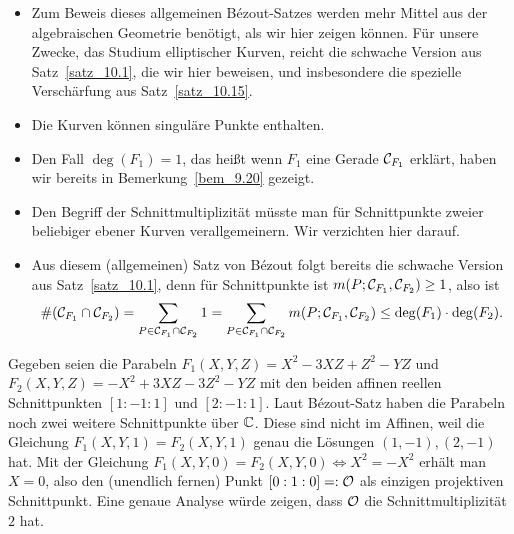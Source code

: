 \begin{bem}
	\begin{itemize}
		\item Zum Beweis dieses allgemeinen Bézout-Satzes werden mehr Mittel aus der algebraischen Geometrie benötigt, als wir hier zeigen können. 
		Für unsere Zwecke, das Studium elliptischer Kurven, reicht die schwache Version aus Satz~\ref{satz_10.1}, die wir hier beweisen, und insbesondere die spezielle Verschärfung aus Satz~\ref{satz_10.15}.
		\item Die Kurven können singuläre Punkte enthalten.
		\item Den Fall $\deg(F_1) = 1$, das heißt wenn $F_1$ eine Gerade $\mathcal{C}_{F_1}$ erklärt, haben wir bereits in Bemerkung~\ref{bem_9.20} gezeigt.
		\item Den Begriff der Schnittmultiplizität müsste man für Schnittpunkte zweier beliebiger ebener Kurven verallgemeinern. 
		Wir verzichten hier darauf.
		\item Aus diesem (allgemeinen) Satz von Bézout folgt bereits die schwache Version aus Satz~\ref{satz_10.1}, denn für Schnittpunkte ist $m(P;\mathcal{C}_{F_1},\mathcal{C}_{F_2}) \geq 1$, also ist
		\[ \#(\mathcal{C}_{F_1} \cap \mathcal{C}_{F_2}) = \sum_{P \in \mathcal{C}_{F_1} \cap \mathcal{C}_{F_2}} 1 = \sum_{P \in \mathcal{C}_{F_1} \cap \mathcal{C}_{F_2}} m(P;\mathcal{C}_{F_1},\mathcal{C}_{F_2}) \leq \deg(F_1) \cdot \deg(F_2).\]
	\end{itemize}
\end{bem}

\begin{bsp}
	Gegeben seien die Parabeln $F_1(X,Y,Z) = X^2 - 3XZ+Z^2-YZ$ und $F_2(X,Y,Z) = -X^2 + 3XZ - 3Z^2 - YZ$ mit den beiden affinen reellen Schnittpunkten $[1:-1:1]$ und $[2:-1:1]$. 
	Laut Bézout-Satz haben die Parabeln noch zwei weitere Schnittpunkte über $\mathbb{C}$. 
	Diese sind nicht im Affinen, weil die Gleichung $F_1(X,Y,1) = F_2(X,Y,1)$ genau die Lösungen $(1,-1),(2,-1)$ hat. 
	Mit der Gleichung $F_1(X,Y,0) = F_2(X,Y,0) \Leftrightarrow X^2 = -X^2$ erhält man $X = 0$, also den (unendlich fernen) Punkt $[0:1:0] =: \mathcal{O}$ als einzigen projektiven Schnittpunkt. 
	Eine genaue Analyse würde zeigen, dass $\mathcal{O}$ die Schnittmultiplizität $2$ hat.
\end{bsp}

